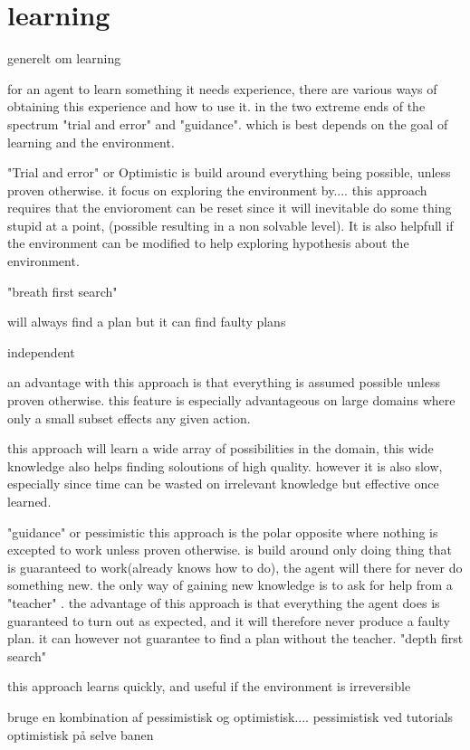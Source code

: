 \section{learning}
generelt om learning
	
	for an agent to learn something it needs experience, there are various ways of obtaining this experience and how to use it. in the two extreme ends of the spectrum "trial and error" and "guidance". which is best depends on the goal of learning and the environment.

	
	"Trial and error" or Optimistic is build around everything being possible, unless proven otherwise. it focus on exploring the environment by....
		this approach requires that the envioroment can be reset since it will inevitable do some thing stupid at a point, (possible resulting in a non solvable level). It is also helpfull if the environment can be modified to help exploring hypothesis about the environment.
		
		"breath first search"
		
		will always find a plan but it can find faulty plans

		independent

		an advantage with this approach is that everything is assumed possible unless proven otherwise. this feature is especially advantageous on large domains where only a small subset effects any given action.
		
		this approach will learn a wide array of possibilities in the domain, this wide knowledge also helps finding soloutions of high quality. however it is also slow, especially since time can be wasted on irrelevant knowledge but effective once learned.
		
		
	"guidance" or pessimistic this approach is the polar opposite where nothing is excepted to work unless proven otherwise. is build around only doing thing that is guaranteed to work(already knows how to do), the agent will there for never do something new. the only way of gaining new knowledge is to ask for help from a "teacher" \cite{Action-Schemas}.
	the advantage of this approach is that everything the agent does is guaranteed to turn out as expected, and it will therefore never produce a faulty plan. it can however not guarantee to find a plan without the teacher.
	"depth first search"
	
	this approach learns quickly, and useful if the environment is irreversible
	
	
	bruge en kombination af pessimistisk og optimistisk....
		pessimistisk ved tutorials
		optimistisk på selve banen		
		
